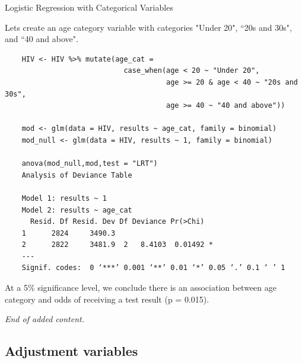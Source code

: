 \documentclass[10pt,t]{beamer}
\begin{document}
\begin{frame}[fragile]{Logistic Regression with Categorical Variables}
	\vspace{-5 mm}
	
	Lets create an age category variable with categories "Under 20", ``20s and 30s", and ``40 and above".
	
	\scriptsize
	
	\begin{verbatim}
	HIV <- HIV %>% mutate(age_cat = 
	                        case_when(age < 20 ~ "Under 20",
	                                  age >= 20 & age < 40 ~ "20s and 30s",
	                                  age >= 40 ~ "40 and above"))
	
	mod <- glm(data = HIV, results ~ age_cat, family = binomial)
	mod_null <- glm(data = HIV, results ~ 1, family = binomial)
	
	anova(mod_null,mod,test = "LRT")
	Analysis of Deviance Table
	
	Model 1: results ~ 1
	Model 2: results ~ age_cat
	  Resid. Df Resid. Dev Df Deviance Pr(>Chi)  
	1      2824     3490.3                       
	2      2822     3481.9  2   8.4103  0.01492 *
	---
	Signif. codes:  0 ‘***’ 0.001 ‘**’ 0.01 ‘*’ 0.05 ‘.’ 0.1 ‘ ’ 1
	\end{verbatim}
	
	\normalsize
	At a 5\% significance level, we conclude there is an association between age category and odds of receiving a test result (p = 0.015).
	
	\medskip
	
	\textit{End of added content.}
	
\end{frame}

\subsection{Adjustment variables}
\end{document}
